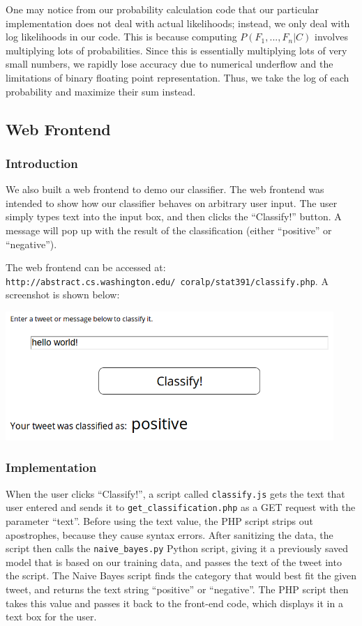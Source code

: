 \documentclass[12pt,a4paper]{article}
\begin{document}
One may notice from our probability calculation code that our particular implementation does not deal with actual likelihoods; instead, we only deal with log likelihoods in our code. This is because computing $P(F_1, ..., F_n | C)$ involves multiplying lots of probabilities. Since this is essentially multiplying lots of very small numbers, we rapidly lose accuracy due to numerical underflow and the limitations of binary floating point representation. Thus, we take the log of each probability and maximize their sum instead.

\subsection{Web Frontend}

\subsubsection{Introduction}
We also built a web frontend to demo our classifier. The web frontend was intended to show how our classifier behaves on arbitrary  user input. The user simply types text into the input box, and then clicks the ``Classify!'' button. A message will pop up with the result of the classification (either ``positive'' or ``negative'').

The web frontend can be accessed at: \texttt{http://abstract.cs.washington.edu/~coralp/stat391/classify.php}. A screenshot is shown below:

\includegraphics[width=470px]{figs/web_frontend.png}

\subsubsection{Implementation}
When the user clicks ``Classify!'', a script called \texttt{classify.js} gets the text that user entered and sends it to \texttt{get\_classification.php} as a GET request with the parameter ``text''. Before using the text value, the PHP script strips out apostrophes, because they cause syntax errors. After sanitizing the data, the script then calls the \texttt{naive\_bayes.py} Python script, giving it a previously saved model that is based on our training data, and passes the text of the tweet into the script. The Naive Bayes script finds the category that would best fit the given tweet, and returns the text string ``positive'' or ``negative''. The PHP script then takes this value and passes it back to the front-end code, which displays it in a text box for the user.
\end{document}
